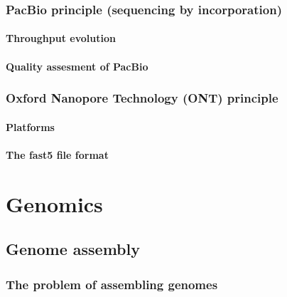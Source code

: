 \documentclass[
  letterpaper,
  DIV=11,
  numbers=noendperiod,
  oneside]{scrreprt}
\begin{document}
\hypertarget{pacbio-principle-sequencing-by-incorporation}{%
\section{PacBio principle (sequencing by
incorporation)}\label{pacbio-principle-sequencing-by-incorporation}}

\hypertarget{throughput-evolution}{%
\subsection{Throughput evolution}\label{throughput-evolution}}

\hypertarget{quality-assesment-of-pacbio}{%
\subsection{Quality assesment of
PacBio}\label{quality-assesment-of-pacbio}}

\hypertarget{oxford-nanopore-technology-ont-principle}{%
\section{Oxford Nanopore Technology (ONT)
principle}\label{oxford-nanopore-technology-ont-principle}}

\hypertarget{platforms}{%
\subsection{Platforms}\label{platforms}}

\hypertarget{the-fast5-file-format}{%
\subsection{The fast5 file format}\label{the-fast5-file-format}}

\part{Genomics}

\hypertarget{sec-genomics}{%
\chapter{Genome assembly}\label{sec-genomics}}

\hypertarget{the-problem-of-assembling-genomes}{%
\section{The problem of assembling
genomes}\label{the-problem-of-assembling-genomes}}
\end{document}

